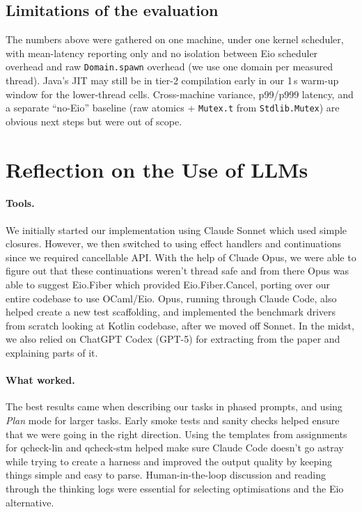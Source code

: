 \documentclass[11pt,a4paper]{article}
\begin{document}
\subsection{Limitations of the evaluation}
\label{sec:eval-limitations}

The numbers above were gathered on one machine, under one kernel
scheduler, with mean-latency reporting only and no isolation between
Eio scheduler overhead and raw \texttt{Domain.spawn} overhead (we use
one domain per measured thread). Java's JIT may still be in tier-2
compilation early in our 1\,s warm-up window for the lower-thread
cells. Cross-machine variance, p99/p999 latency, and a separate
``no-Eio'' baseline (raw atomics + \texttt{Mutex.t} from
\texttt{Stdlib.Mutex}) are obvious next steps but were out of scope.

\section{Reflection on the Use of LLMs}
\label{sec:llm}

\paragraph{Tools.} We initially started our implementation using Claude Sonnet
which used simple closures. However, we then switched to using effect handlers
and continuations since we required cancellable API. With the help of Cluade
Opus, we were able to figure out that these continuations weren't thread safe
and from there Opus was able to suggest Eio.Fiber which provided
Eio.Fiber.Cancel, porting over our entire codebase to use OCaml/Eio. Opus,
running through Claude Code, also helped create a new test scaffolding, and
implemented the benchmark drivers from scratch looking at Kotlin codebase, after
we moved off Sonnet. In the midst, we also relied on ChatGPT Codex (GPT-5) for
extracting from the paper and explaining parts of it.

\paragraph{What worked.} The best results came when describing our tasks in
phased prompts, and using \emph{Plan} mode for larger tasks. Early smoke tests
and sanity checks helped ensure that we were going in the right direction. Using
the templates from assignments for qcheck-lin and qcheck-stm helped make sure
Claude Code doesn't go astray while trying to create a harness and improved the
output quality by keeping things simple and easy to parse. Human-in-the-loop
discussion and reading through the thinking logs were essential for selecting
optimisations and the Eio alternative.
\end{document}
